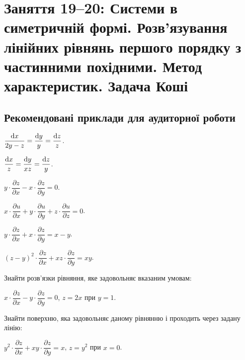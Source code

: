 \section*{Заняття 19--20: Системи в симетричній формі. Розв'язування лінійних рівнянь першого порядку з частинними похідними. Метод характеристик. Задача Коші}

\subsection*{Рекомендовані приклади для аудиторної роботи}

\begin{problem}
	$\dfrac{\mathop{}\!\mathrm{d} x}{2 y - z} = \dfrac{\mathop{}\!\mathrm{d} y}{y} = \dfrac{\mathop{}\!\mathrm{d} z}{z}$.
\end{problem}

\begin{problem}
	$\dfrac{\mathop{}\!\mathrm{d} x}{z} = \dfrac{\mathop{}\!\mathrm{d} y}{x z} = \dfrac{\mathop{}\!\mathrm{d} z}{y}$.
\end{problem}

\begin{problem}
	$y \cdot \dfrac{\partial z}{\partial x} - x \cdot \dfrac{\partial z}{\partial y} = 0$.
\end{problem}

\begin{problem}
	$x \cdot \dfrac{\partial u}{\partial x} + y \cdot \dfrac{\partial u}{\partial y} + z \cdot \dfrac{\partial u}{\partial z} = 0$.
\end{problem}

\begin{problem}
	$y \cdot \dfrac{\partial z}{\partial x} + x \cdot \dfrac{\partial z}{\partial y} = x - y$.
\end{problem}

\begin{problem}
	$(z - y)^2 \cdot \dfrac{\partial z}{\partial x} + x z \cdot \dfrac{\partial z}{\partial y} = x y$.
\end{problem}

Знайти розв'язки рівняння, яке задовольняє вказаним умовам:

\begin{problem}
	$x \cdot \dfrac{\partial z}{\partial x} - y \cdot \dfrac{\partial z}{\partial y} = 0$, $z = 2 x$ при $y = 1$.
\end{problem}

Знайти поверхню, яка задовольняє даному рівнянню і проходить через задану лінію:

\begin{problem}
	$y^2 \cdot \dfrac{\partial z}{\partial x} + x y \cdot \dfrac{\partial z}{\partial y} = x$, $z = y^2$ при $x = 0$.
\end{problem}

